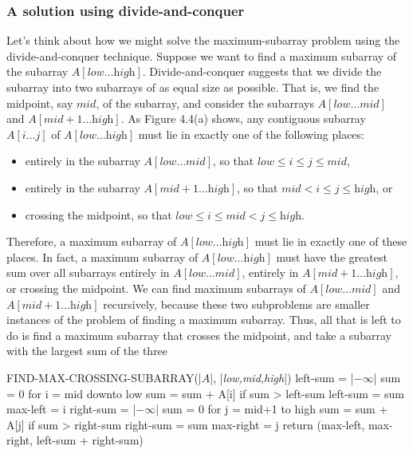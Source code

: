 \documentclass{report}
\begin{document}
        \subsubsection{A solution using divide-and-conquer}
        \bigbreak \noindent 
        Let’s think about how we might solve the maximum-subarray problem using the divide-and-conquer technique. Suppose we want to find a maximum subarray of the subarray \( A[\textit{low} \ldots \textit{high}] \). Divide-and-conquer suggests that we divide the subarray into two subarrays of as equal size as possible. That is, we find the midpoint, say \( \textit{mid} \), of the subarray, and consider the subarrays \( A[\textit{low} \ldots \textit{mid}] \) and \( A[\textit{mid} + 1 \ldots \textit{high}] \). As Figure 4.4(a) shows, any contiguous subarray \( A[i \ldots j] \) of \( A[\textit{low} \ldots \textit{high}] \) must lie in exactly one of the following places:
        \begin{itemize}
            \item entirely in the subarray \( A[\textit{low} \ldots \textit{mid}] \), so that \( \textit{low} \leq i \leq j \leq \textit{mid} \),
            \item entirely in the subarray \( A[\textit{mid} + 1 \ldots \textit{high}] \), so that \( \textit{mid} < i \leq j \leq \textit{high} \), or
            \item crossing the midpoint, so that \( \textit{low} \leq i \leq \textit{mid} < j \leq \textit{high} \).
        \end{itemize}
        Therefore, a maximum subarray of \( A[\textit{low} \ldots \textit{high}] \) must lie in exactly one of these places. In fact, a maximum subarray of \( A[\textit{low} \ldots \textit{high}] \) must have the greatest sum over all subarrays entirely in \( A[\textit{low} \ldots \textit{mid}] \), entirely in \( A[\textit{mid} + 1 \ldots \textit{high}] \), or crossing the midpoint. We can find maximum subarrays of \( A[\textit{low} \ldots \textit{mid}] \) and \( A[\textit{mid} + 1 \ldots \textit{high}] \) recursively, because these two subproblems are smaller instances of the problem of finding a maximum subarray. Thus, all that is left to do is find a maximum subarray that crosses the midpoint, and take a subarray with the largest sum of the three
        \bigbreak \noindent 
        \bigbreak \noindent 
        \begin{cppcode}
        FIND-MAX-CROSSING-SUBARRAY(|$A$|, |\textit{low,mid,high}|)
            left-sum = |$-\infty$|
            sum = 0
            for i = mid downto low
                sum = sum + A[i]
                if sum > left-sum
                    left-sum = sum
                    max-left = i
            right-sum = |$-\infty$|
            sum = 0
            for j = mid+1 to high
                sum = sum + A[j]
                if sum > right-sum
                    right-sum = sum
                    max-right = j
            return (max-left, max-right, left-sum + right-sum)
        \end{cppcode}
\end{document}
